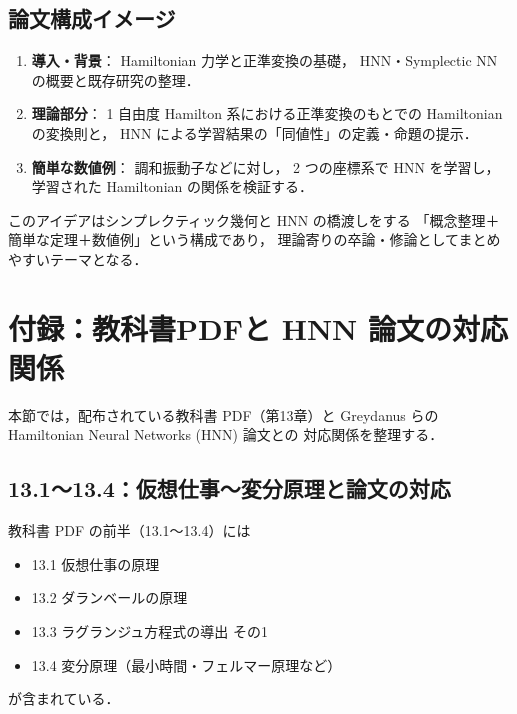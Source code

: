 \documentclass[a4paper,12pt]{jlreq}
\begin{document}
\subsection*{論文構成イメージ}

\begin{enumerate}
  \item \textbf{導入・背景}：  
        Hamiltonian 力学と正準変換の基礎，
        HNN・Symplectic NN の概要と既存研究の整理．
  \item \textbf{理論部分}：  
        1 自由度 Hamilton 系における正準変換のもとでの
        Hamiltonian の変換則と，
        HNN による学習結果の「同値性」の定義・命題の提示．
  \item \textbf{簡単な数値例}：  
        調和振動子などに対し，
        2 つの座標系で HNN を学習し，
        学習された Hamiltonian の関係を検証する．
\end{enumerate}

このアイデアはシンプレクティック幾何と HNN の橋渡しをする
「概念整理＋簡単な定理＋数値例」という構成であり，
理論寄りの卒論・修論としてまとめやすいテーマとなる．










\section*{付録：教科書PDFと HNN 論文の対応関係}

本節では，配布されている教科書 PDF（第13章）と
Greydanus らの Hamiltonian Neural Networks (HNN) 論文との
対応関係を整理する．

\subsection*{13.1～13.4：仮想仕事～変分原理と論文の対応}

教科書 PDF の前半（13.1～13.4）には
\begin{itemize}
  \item 13.1 仮想仕事の原理
  \item 13.2 ダランベールの原理
  \item 13.3 ラグランジュ方程式の導出 その1
  \item 13.4 変分原理（最小時間・フェルマー原理など）
\end{itemize}
が含まれている．
\end{document}
